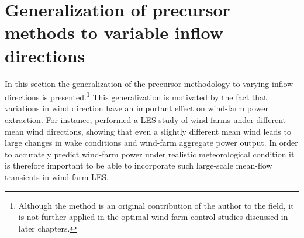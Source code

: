 
\clearpage	
	
\section{Generalization of precursor methods to variable inflow directions}\label{sec:inflow_var}

	In this section the generalization of the precursor methodology to varying inflow directions is presented.\footnote{	Although the method is an original contribution of the author to the field, it is not further applied in the optimal wind-farm control studies discussed in later chapters.}
	This generalization is motivated by the fact that variations in wind direction have an important effect on wind-farm power extraction. For instance, \cite{porte2013numerical} performed a LES study of wind farms under different mean wind directions, showing that even a slightly different mean wind leads to large changes in wake conditions and wind-farm aggregate power output. In order to accurately predict wind-farm power under realistic meteorological condition it is therefore important to be able to incorporate such large-scale mean-flow transients in wind-farm LES. 
	

